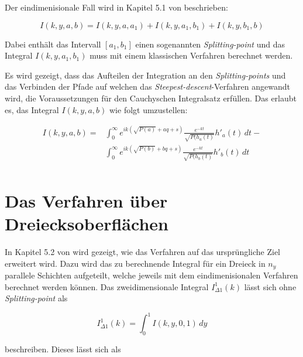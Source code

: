 Der eindimenisionale Fall wird in Kapitel 5.1 von \cite{gasperini:hal-03209144} beschrieben: 

\begin{equation}
    I(k,y,a,b) = I(k,y,a,a_1) + I(k,y,a_1, b_1) + I(k,y,b_1,b)
\end{equation}

Dabei enthält das Intervall $[a_1,b_1]$ einen sogenannten \textit{Splitting-point} und das Integral $I(k,y,a_1,b_1)$ muss mit einem klassischen Verfahren berechnet werden.


Es wird gezeigt, dass das Aufteilen der Integration an den \textit{Splitting-points} und das Verbinden der Pfade auf welchen das \textit{Steepest-descent}-Verfahren angewandt wird, die Voraussetzungen für den Cauchyschen Integralsatz erfüllen.
Das erlaubt es, das Integral $I(k,y,a,b)$ wie folgt umzustellen:

\begin{equation}
    \begin{aligned}
    I(k,y,a,b) =& \int_{0}^{\infty} e^{ik(\sqrt{P(a)} + aq +s)} \frac{e^{-kt}}{\sqrt{P(h_a(t)}} h'_a(t)\,dt -\\
    & \int_{0}^{\infty} e^{ik(\sqrt{P(b)} + bq +s)} \frac{e^{-kt}}{\sqrt{P(h_b(t)}} h'_b(t)\,dt \\
    \end{aligned}
\end{equation}

\section{Das Verfahren über Dreiecksoberflächen}

In Kapitel 5.2 von \cite*{gasperini:hal-03209144} wird gezeigt, wie das Verfahren auf das ursprüngliche Ziel erweitert wird.
Dazu wird das zu berechnende Integral für ein Dreieck in $n_y$ parallele Schichten aufgeteilt, welche jeweils mit dem eindimenisionalen Verfahren berechnet werden können.
Das zweidimensionale Integral $I_{\Delta1}^1(k)$ lässt sich ohne \textit{Splitting-point} als

\begin{equation}
    I_{\Delta1}^1(k) = \int_{0}^{1} I(k,y,0,1) \,dy 
\end{equation}

beschreiben. Dieses lässt sich als


